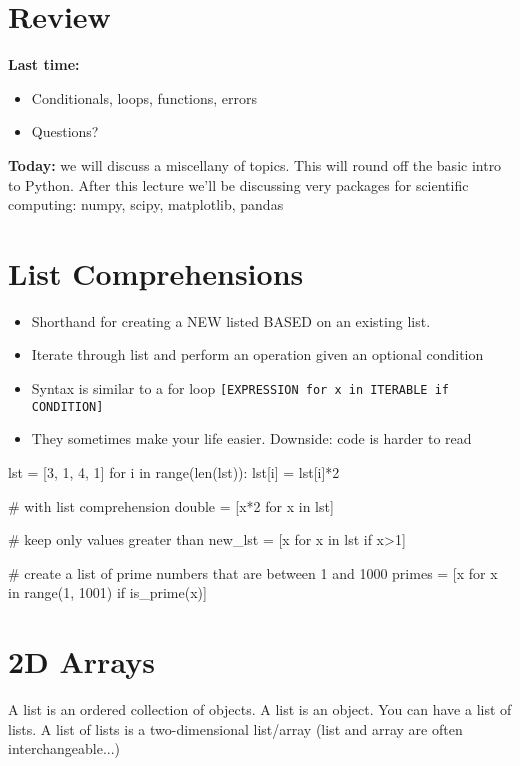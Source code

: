 \documentclass[12pt]{article}
\numberwithin{equation}{section}
\begin{document}
\section{Review}

\textbf{Last time:}
\begin{itemize}
    \item Conditionals, loops, functions, errors
    \item Questions?
\end{itemize}

\textbf{Today:} we will discuss a miscellany of topics. This will round off the basic intro to Python. After this lecture we'll be discussing very packages for scientific computing: numpy, scipy, matplotlib, pandas

\section{List Comprehensions}
\begin{itemize}
    \item Shorthand for creating a NEW listed BASED on an existing list.
    \item Iterate through list and perform an operation given an optional condition
    \item Syntax is similar to a for loop
    \verb|[EXPRESSION for x in ITERABLE if CONDITION]|
    \item They sometimes make your life easier. Downside: code is harder to read
\end{itemize}

\begin{python}
lst = [3, 1, 4, 1]
for i in range(len(lst)):
    lst[i] = lst[i]*2

# with list comprehension
double = [x*2 for x in lst]

# keep only values greater than 
new_lst = [x for x in lst if x>1]

# create a list of prime numbers that are between 1 and 1000
primes = [x for x in range(1, 1001) if is_prime(x)]
\end{python}

\section{2D Arrays}
A list is an ordered collection of objects. A list is an object. You can have a list of lists. A list of lists is a two-dimensional list/array (list and array are often interchangeable...)
\end{document}
